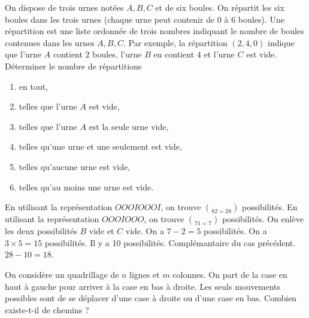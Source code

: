 \documentclass{magnolia}
\begin{document}
On dispose de trois urnes notées $A,B,C$ et de six boules. On répartit les six boules dans
les trois urnes (chaque urne peut contenir de $0$ à $6$ boules). Une répartition est une
liste ordonnée de trois nombres indiquant le nombre de boules contenues dans les urnes
$A,B,C$. Par exemple, la répartition $(2,4,0)$ indique que l'urne $A$ contient $2$ boules,
l'urne $B$ en contient $4$ et l'urne $C$ est vide.
Déterminer le nombre de répartitions
\begin{enumerate}
\item en tout,
\item telles que l'urne $A$ est vide,
\item telles que l'urne $A$ est la seule urne vide,
\item telles qu'une urne et une seulement est vide,
\item telles qu'aucune urne est vide,
\item telles qu'au moins une urne est vide.
\end{enumerate}
\begin{sol}
\begin{questions}
\question En utilisant la représentation $OOOIOOOI$, on trouve $\choose{8}{2}=28$ possibilités.
\question En utilisant la représentation $OOOIOOO$, on trouve $\choose{7}{1}=7$ possibilités.
\question On enlève les deux possibilités $B$ vide et $C$ vide. On a $7-2=5$ possibilités.
\question On a $3\times 5=15$ possibilités.
\question Il y a 10 possibilités.
\question Complémantaire du cas précédent. $28-10=18$.
\end{questions}
\end{sol}



On considère un quadrillage de $n$ lignes et $m$ colonnes. On part de la case en haut à gauche pour arriver à la case en bas à droite. Les seuls mouvements possibles sont de se déplacer d'une case à droite ou d'une case en bas. 
Combien existe-t-il de chemins ?


%
\end{document}
